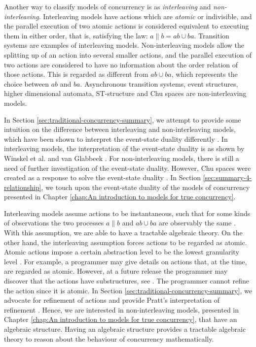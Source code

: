         Another way to classify models of concurrency is as \emph{interleaving} and \emph{non-interleaving}. Interleaving models have actions which are \emph{atomic} or indivisible, and the parallel execution of two atomic actions is considered equivalent to executing them in either order, that is, satisfying the law: $a \parallel b = ab \cup ba$. Transition systems are examples of interleaving models. Non-interleaving models allow the splitting up of an action into several smaller actions, and the parallel execution of two actions are considered to have no information about the order relation of those actions. This is regarded as different from $ab \cup ba$, which represents the choice between $ab$ and  $ba$. Asynchronous transition systems, event structures, higher dimensional automata, ST-structure and Chu spaces are non-interleaving models.
    
        In Section \ref{sec:traditional-concurrency-summary}, we attempt to provide some intuition on the difference between interleaving and non-interleaving models, which have been shown to interpret the event-state duality differently \cite{pratt91hda, Pratt02eventStateDuality}. In interleaving models, the interpretation of the event-state duality is as shown by Winskel et al. \cite{NielsenPW81eventstructures} and van Glabbeek \cite{GlabbeekP09configStruct}. For non-interleaving models, there is still a need of further investigation of the event-state duality. However, Chu spaces were created as a response to solve the event-state duality \cite{gupta94phd_Chu}. In Section \ref{sec:summary-4-relationship}, we touch upon the event-state duality of the models of concurrency presented in Chapter \ref{chap:An introduction to models for true concurrency}.
    
        Interleaving models assume actions to be instantaneous, such that for some kinds of observations the two processes $a \parallel b$ and $ab \cup ba$ are observably the same \cite{GlabbeekV97splitting}. With this assumption, we are able to have a tractable algebraic theory. On the other hand, the interleaving assumption forces actions to be regarded as atomic. Atomic actions impose a certain abstraction level to be the lowest granularity level \cite{GlabbeekG89refinement, GlabbeekG01refinement, pratt91hda}. For example, a programmer may give details on actions that, at the time, are regarded as atomic. However, at a future release the programmer may discover that the actions have substructures, see \cite[Example 1.1]{GlabbeekG89refinement}. The programmer cannot refine the action since it is atomic. In Section \ref{sec:traditional-concurrency-summary}, we advocate for refinement of actions and provide Pratt's interpretation of refinement \cite{pratt91hda}. Hence, we are interested in non-interleaving models, presented in Chapter \ref{chap:An introduction to models for true concurrency}, that have an algebraic structure. Having an algebraic structure provides a tractable algebraic theory to reason about the behaviour of concurrency mathematically.
   
